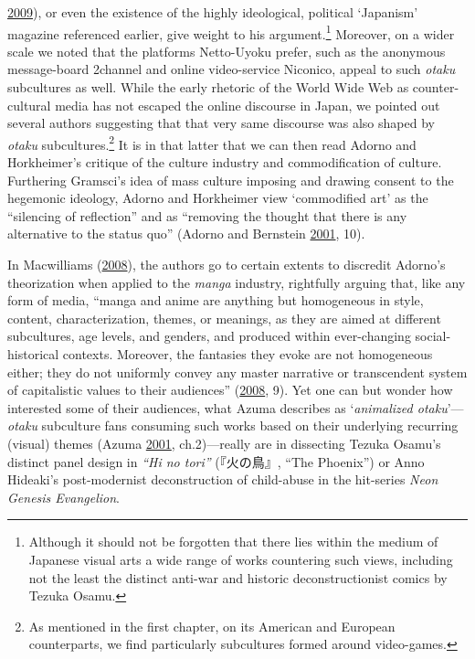 \documentclass[10pt,british,A4paper,twoside]{memoir}
\begin{document}
\protect\hyperlink{ref-penney_nationalism_2009}{2009}), or even the
existence of the highly ideological, political `Japanism' magazine
referenced earlier, give weight to his argument.\footnote{Although it should not be forgotten that there lies within the medium of Japanese
  visual arts a wide range of works countering such views,
  including not the least the distinct anti-war and historic
  deconstructionist comics by Tezuka Osamu.} Moreover, on a wider scale
we noted that the platforms Netto-Uyoku prefer, such as the anonymous
message-board 2channel and online video-service Niconico, appeal to such
\emph{otaku} subcultures as well. While the early rhetoric of the World
Wide Web as counter-cultural media has not escaped the online discourse
in Japan, we pointed out several authors suggesting that that very same
discourse was also shaped by \emph{otaku} subcultures.\footnote{As mentioned in the first chapter, on its American and European
  counterparts, we find particularly subcultures formed around video-games.} It is in that latter that we can then read Adorno and
Horkheimer's critique of the culture industry and commodification of
culture. Furthering Gramsci's idea of mass culture imposing and drawing
consent to the hegemonic ideology, Adorno and Horkheimer view
`commodified art' as the ``silencing of reflection'' and as ``removing
the thought that there is any alternative to the status quo'' (Adorno
and Bernstein \protect\hyperlink{ref-adorno_culture_2001}{2001}, 10).

In Macwilliams
(\protect\hyperlink{ref-macwilliams_japanese_2008}{2008}), the authors
go to certain extents to discredit Adorno's theorization when applied to
the \emph{manga} industry, rightfully arguing that, like any form of
media, ``manga and anime are anything but homogeneous in style, content,
characterization, themes, or meanings, as they are aimed at different
subcultures, age levels, and genders, and produced within ever-changing
social-historical contexts. Moreover, the fantasies they evoke are not
homogeneous either; they do not uniformly convey any master narrative or
transcendent system of capitalistic values to their audiences''
(\protect\hyperlink{ref-macwilliams_japanese_2008}{2008}, 9). Yet one
can but wonder how interested some of their audiences, what Azuma
describes as `\emph{animalized otaku}'---\emph{otaku} subculture fans
consuming such works based on their underlying recurring (visual) themes
(Azuma \protect\hyperlink{ref-azuma_otaku:_2001}{2001}, ch.2)---really
are in dissecting Tezuka Osamu's distinct panel design in \emph{``Hi no
tori''} (『火の鳥』, ``The Phoenix'') or Anno Hideaki's post-modernist
deconstruction of child-abuse in the hit-series \emph{Neon Genesis
Evangelion}.
\end{document}
